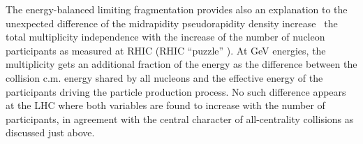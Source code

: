 \documentclass[twocolumn,showpacs,preprintnumbers,prd,superscriptaddress,nofootinbib]{revtex4}
\begin{document}
 The energy-balanced limiting fragmentation provides also 
an explanation  
 to the unexpected difference of the midrapidity pseudorapidity density 
increase 
\vrs\ the total multiplicity independence with the increase of the 
number of 
nucleon participants as measured at RHIC (RHIC ``puzzle'' 
\cite{edwardPRD}).
At GeV energies,  the multiplicity gets an additional fraction of the 
energy as the difference between the collision c.m. energy shared by all 
nucleons and the effective energy of the participants driving the 
particle production process. No such difference appears at the LHC where 
both variables are found to increase with the number of 
participants, in agreement with the central character of all-centrality 
collisions as discussed just above.



 




   
\end{document}
